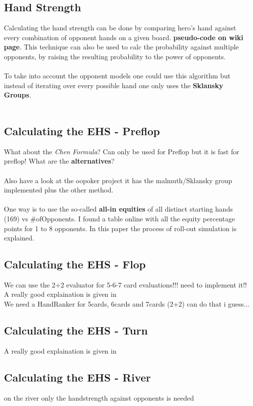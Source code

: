 \subsection{Hand Strength}
Calculating the hand strength can be done by comparing hero's hand against every combination of opponent hands on a given board. 
\textbf{pseudo-code on wiki page}. This technique can also be used to calc the probability against multiple opponents, by raising the resulting probability to the power of opponents. \cite{ehs_calc}\\\\

To take into account the opponent models one could use this algorithm but instead of iterating over every possible hand one only uses the \textbf{Sklansky Groups}. \cite{ehs_calc}\\\\
\subsection{Calculating the EHS - Preflop}
What about the \textit{Chen Formula}? Can only be used for Preflop but it is fast for preflop! What are the \textbf{alternatives}?\\\\
Also have a look at the oopoker project it has the malmuth/Sklansky group implemented plus the other method.\\\\
One way is to use the so-called \textbf{all-in equities} of all distinct starting hands (169) vs \#ofOpponents. I found a table online with all the equity percentage points for 1 to 8 opponents. In this paper the process of roll-out simulation is explained. \cite{algo_poker}
\subsection{Calculating the EHS - Flop}
We can use the 2+2 evaluator for 5-6-7 card evaluations!!! need to implement it!!
A really good explaination is given in \cite{opp_mod}\\
We need a HandRanker for 5cards, 6cards and 7cards (2+2) can do that i guess...
\subsection{Calculating the EHS - Turn}
A really good explaination is given in \cite{opp_mod}
\subsection{Calculating the EHS - River}
on the river only the handstrength against opponents is needed
